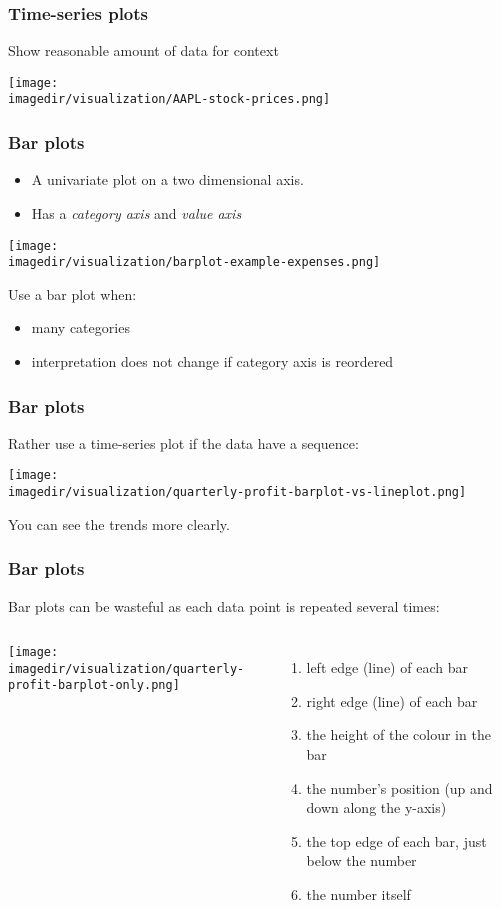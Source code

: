 \begin{frame}\frametitle{Time-series plots}
	
	Show reasonable amount of data for context 
	\begin{center}
		\texttt{[image: \\imagedir/visualization/AAPL-stock-prices.png]}
	\end{center}
\end{frame}

\begin{frame}\frametitle{Bar plots}
	\begin{itemize}
		\item	A univariate plot on a two dimensional axis. 
		\item	Has a \emph{category axis} and \emph{value axis} 
	\end{itemize}
	\begin{center}
		\texttt{[image: \\imagedir/visualization/barplot-example-expenses.png]}
	\end{center}
	\vspace{-8pt}
	Use a bar plot when: 
	\begin{itemize}
		\item	many categories 
		\item	interpretation does not change if category axis is reordered 
	\end{itemize}
\end{frame}

\begin{frame}\frametitle{Bar plots}
	
	Rather use a time-series plot if the data have a sequence: 
	\begin{center}
		\texttt{[image: \\imagedir/visualization/quarterly-profit-barplot-vs-lineplot.png]}
	\end{center}
	You can see the trends more clearly.
\end{frame}

\begin{frame}\frametitle{Bar plots}
	
	Bar plots can be wasteful as each data point is repeated several times:
	\vspace{-8pt}
	\begin{columns}[c]
		\column{6cm} 
			\begin{center}
				\texttt{[image: \\imagedir/visualization/quarterly-profit-barplot-only.png]} 
			\end{center}
		\column{4cm} 
			\begin{enumerate}
				\item	left edge (line) of each bar 
				\item	right edge (line) of each bar 
				\item	the height of the colour in the bar 
				\item	the number's position (up and down along the y-axis) 
				\item	the top edge of each bar, just below the number 
				\item	the number itself 
			\end{enumerate}
	\end{columns}
\end{frame}


